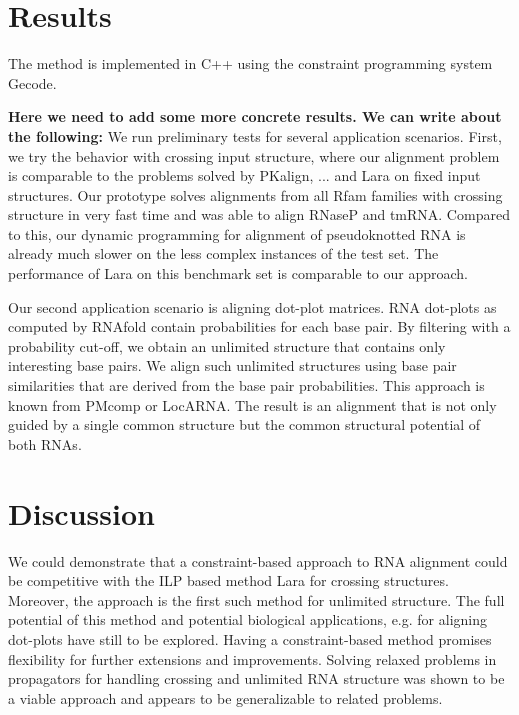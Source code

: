 \documentclass[11pt]{llncs}
\begin{document}



\section{Results}

The method is implemented in C++ using the constraint programming
system Gecode. 

{\bf Here we need to add some more concrete results. We can write about the following:}
We run preliminary tests for several application scenarios. First, we
try the behavior with crossing input structure, where our alignment
problem is comparable to the problems solved by PKalign, ... and Lara
on fixed input structures. Our prototype solves alignments from all
Rfam families with crossing structure in very fast time and was able
to align RNaseP and tmRNA. Compared to this, our dynamic programming
for alignment of pseudoknotted RNA is already much slower on the less
complex instances of the test set.  The performance of Lara on this
benchmark set is comparable to our approach.

Our second application scenario is aligning dot-plot matrices. RNA
dot-plots as computed by RNAfold\cite{RNAfold} contain probabilities
for each base pair. By filtering with a probability cut-off, we obtain
an unlimited structure that contains only interesting base pairs. We
align such unlimited structures using base pair similarities that are
derived from the base pair probabilities. This approach is known from
PMcomp or LocARNA. The result is an alignment that is not only guided
by a single common structure but the common structural potential of
both RNAs.

\section{Discussion}

We could demonstrate that a constraint-based approach to RNA alignment
could be competitive with the ILP based method Lara for crossing
structures. Moreover, the approach is the first such method for
unlimited structure. The full potential of this method and potential
biological applications, e.g. for aligning dot-plots have still to be
explored. Having a constraint-based method promises flexibility for
further extensions and improvements. Solving relaxed problems in
propagators for handling crossing and unlimited RNA structure was
shown to be a viable approach and appears to be generalizable to
related problems.
\end{document}
